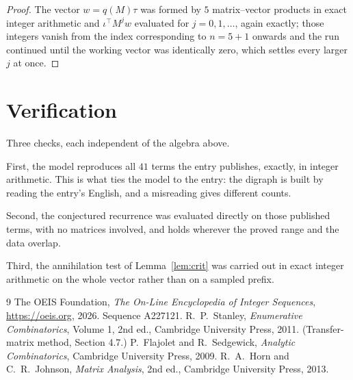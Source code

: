 \documentclass[11pt,a4paper]{article}
\theoremstyle{plain}
\theoremstyle{definition}
\begin{document}
\begin{proof}
The vector $w=q(M)\tau$ was formed by $5$ matrix--vector products in exact integer
arithmetic and $\iota^{\!\top}M^{j}w$ evaluated for $j=0,1,\dots$, again exactly; those
integers vanish from the index corresponding to $n=5+1$ onwards and the run continued
until the working vector was identically zero, which settles every larger $j$ at once.
\end{proof}

\section{Verification}

Three checks, each independent of the algebra above.

First, the model reproduces all $41$ terms the entry publishes, exactly, in integer
arithmetic. This is what ties the model to the entry: the digraph is built by reading the
entry's English, and a misreading gives different counts.

Second, the conjectured recurrence was evaluated directly on those published terms, with no
matrices involved, and holds wherever the proved range and the data overlap.

Third, the annihilation test of Lemma~\ref{lem:crit} was carried out in exact integer
arithmetic on the whole vector rather than on a sampled prefix.

\begin{thebibliography}{9}
 The OEIS Foundation, \emph{The On-Line Encyclopedia of Integer
Sequences}, \url{https://oeis.org}, 2026. Sequence A227121.
 R.~P.~Stanley, \emph{Enumerative Combinatorics}, Volume 1, 2nd ed.,
Cambridge University Press, 2011. (Transfer-matrix method, Section 4.7.)
 P.~Flajolet and R.~Sedgewick, \emph{Analytic Combinatorics}, Cambridge
University Press, 2009.
 R.~A.~Horn and C.~R.~Johnson, \emph{Matrix Analysis}, 2nd ed., Cambridge
University Press, 2013.
\end{thebibliography}
\end{document}
